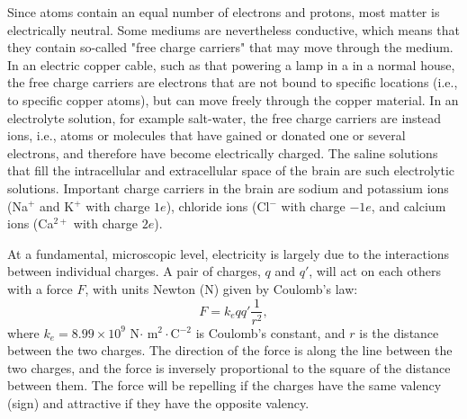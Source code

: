 Since atoms contain an equal number of electrons and protons, most matter is electrically neutral. Some mediums are nevertheless conductive, which means that they contain so-called "free charge carriers" that may move through the medium. In an electric copper cable, such as that powering a lamp in a in a normal house, the free charge carriers are electrons that are not bound to specific locations (i.e., to specific copper atoms), but can move freely through the copper material. In an electrolyte solution, for example salt-water, the free charge carriers are instead ions, i.e., atoms or molecules that have gained or donated one or several electrons, and therefore have become electrically charged. The saline solutions that fill the intracellular and extracellular space of the brain are such electrolytic solutions. Important charge carriers in the brain are sodium and potassium ions (Na$^+$ and K$^+$ with charge $1e$), chloride ions (Cl$^-$ with charge $-1e$, and calcium ions (Ca$^{2+}$ with charge $2e$).

At a fundamental, microscopic level, electricity is largely due to the interactions between individual charges. A pair of charges, $q$ and $q'$, will act on each others with a force $F$, with units Newton (N) given by Coulomb's law:
\begin{equation}
F = k_e qq' \frac{1}{r^2}, 
\label{Basics:eq:CoulombF}
\end{equation}
where $k_e = 8.99\times10^9$ N$\cdot$ m$^2\cdot$C$^{-2}$ is Coulomb's constant, and $r$ is the distance between the two charges. The direction of the force is along the line between the two charges, and the force is inversely proportional to the square of the distance between them. The force will be repelling if the charges have the same valency (sign) and attractive if they have the opposite valency. 

